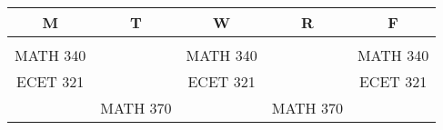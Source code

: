 \documentclass{article}
\begin{document}
\begin{tabular}{ccccc} %
M & T & W & R & F \\
\hline \\ %
MATH 340 & & MATH 340 & & MATH 340 \\
ECET 321 & & ECET 321 & & ECET 321 \\
 & MATH 370 & & MATH 370 &  \\
\end{tabular}
\end{document}

